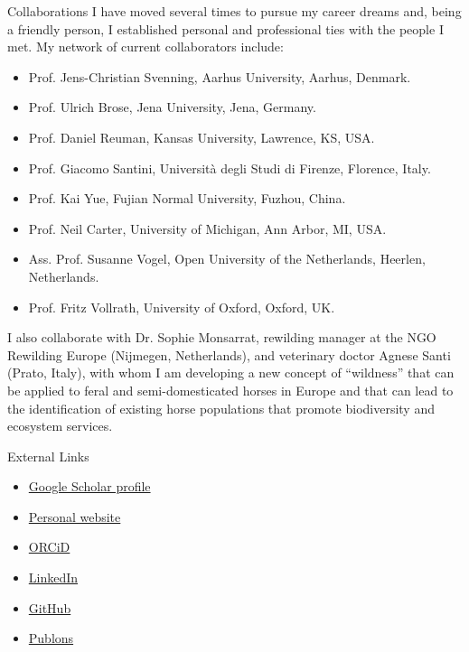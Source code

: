 \documentclass{resume} %
\begin{document}
\begin{rSection}{Collaborations}
I have moved several times to pursue my career dreams and, being a friendly person, I established personal and professional ties with the people I met.
My network of current collaborators include:
\begin{itemize}
\setlength\itemsep{-0.5em}
    \item Prof. Jens-Christian Svenning, Aarhus University, Aarhus, Denmark.
    \item Prof. Ulrich Brose, Jena University, Jena, Germany.
    \item Prof. Daniel Reuman, Kansas University, Lawrence, KS, USA.
    \item Prof. Giacomo Santini, Universit\`{a} degli Studi di Firenze, Florence, Italy.
    \item Prof. Kai Yue, Fujian Normal University, Fuzhou, China.
    \item Prof. Neil Carter, University of Michigan, Ann Arbor, MI, USA.
    \item Ass. Prof. Susanne Vogel, Open University of the Netherlands, Heerlen, Netherlands.
    \item Prof. Fritz Vollrath, University of Oxford, Oxford, UK.
\end{itemize}
I also collaborate with Dr. Sophie Monsarrat, rewilding manager at the NGO Rewilding Europe (Nijmegen, Netherlands), and veterinary doctor Agnese Santi (Prato, Italy), with whom I am developing a new concept of ``wildness'' that can be applied to feral and semi-domesticated horses in Europe and that can lead to the identification of existing horse populations that promote biodiversity and ecosystem services.
\end{rSection}

\begin{rSection}{External Links}
\begin{minipage}{0.5\textwidth}
\begin{itemize}
    \item \href{https://scholar.google.com/citations?user=5KPh-oUAAAAJ&hl=en}{Google Scholar profile}
    \item \href{https://emilio-berti.github.io/}{Personal website}
    \item \href{https://orcid.org/0000-0001-9286-011X}{ORCiD}
\end{itemize}
\end{minipage}
\begin{minipage}{0.5\textwidth}
\begin{itemize}
    \item \href{https://www.linkedin.com/in/emilio-berti-55a348146}{LinkedIn}
    \item \href{https://github.com/emilio-berti}{GitHub}
    \item \href{https://publons.com/wos-op/researcher/4208953/emilio-berti/peer-review/}{Publons}
\end{itemize}
\end{minipage}
\end{rSection}
\end{document}
